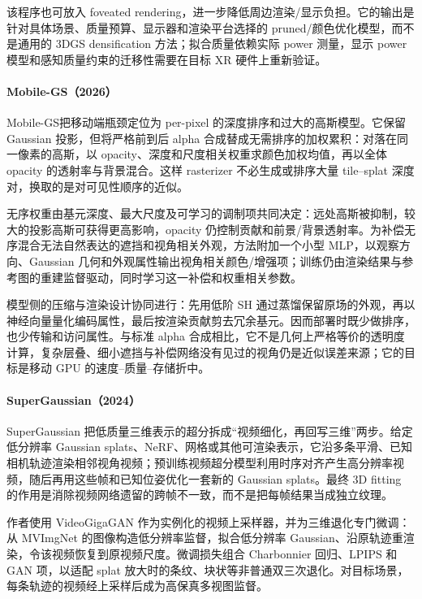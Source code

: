 该程序也可放入 foveated rendering，进一步降低周边渲染/显示负担。它的输出是针对具体场景、质量预算、显示器和渲染平台选择的 pruned/颜色优化模型，而不是通用的 3DGS densification 方法；拟合质量依赖实际 power 测量，显示 power 模型和感知质量约束的迁移性需要在目标 XR 硬件上重新验证。

\paragraph{Mobile-GS（2026）\cite{2603_11531}}
Mobile-GS把移动端瓶颈定位为 per-pixel 的深度排序和过大的高斯模型。它保留 Gaussian 投影，但将严格前到后 alpha 合成替成无需排序的加权累积：对落在同一像素的高斯，以 opacity、深度和尺度相关权重求颜色加权均值，再以全体 opacity 的透射率与背景混合。这样 rasterizer 不必生成或排序大量 tile--splat 深度对，换取的是对可见性顺序的近似。

无序权重由基元深度、最大尺度及可学习的调制项共同决定：远处高斯被抑制，较大的投影高斯可获得更高影响，opacity 仍控制贡献和前景/背景透射率。为补偿无序混合无法自然表达的遮挡和视角相关外观，方法附加一个小型 MLP，以观察方向、Gaussian 几何和外观属性输出视角相关颜色/增强项；训练仍由渲染结果与参考图的重建监督驱动，同时学习这一补偿和权重相关参数。

模型侧的压缩与渲染设计协同进行：先用低阶 SH 通过蒸馏保留原场的外观，再以神经向量量化编码属性，最后按渲染贡献剪去冗余基元。因而部署时既少做排序，也少传输和访问属性。与标准 alpha 合成相比，它不是几何上严格等价的透明度计算，复杂层叠、细小遮挡与补偿网络没有见过的视角仍是近似误差来源；它的目标是移动 GPU 的速度--质量--存储折中。

\paragraph{SuperGaussian（2024）\cite{2406_00609}}
SuperGaussian 把低质量三维表示的超分拆成“视频细化，再回写三维”两步。给定低分辨率 Gaussian splats、NeRF、网格或其他可渲染表示，它沿多条平滑、已知相机轨迹渲染相邻视角视频；预训练视频超分模型利用时序对齐产生高分辨率视频，随后再用这些帧和已知位姿优化一套新的 Gaussian splats。最终 3D fitting 的作用是消除视频网络遗留的跨帧不一致，而不是把每帧结果当成独立纹理。

作者使用 VideoGigaGAN 作为实例化的视频上采样器，并为三维退化专门微调：从 MVImgNet 的图像构造低分辨率监督，拟合低分辨率 Gaussian、沿原轨迹重渲染，令该视频恢复到原视频尺度。微调损失组合 Charbonnier 回归、LPIPS 和 GAN 项，以适配 splat 放大时的条纹、块状等非普通双三次退化。对目标场景，每条轨迹的视频经上采样后成为高保真多视图监督。

